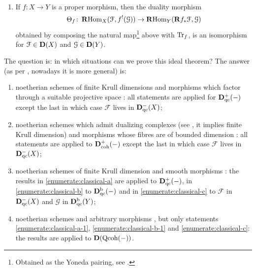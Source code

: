 \documentclass[10pt,a4paper]{article}
\begin{document}
\begin{theorem} {\ }
\begin{enumerate}
\begin{enumerate}
        \item\label{enumerate:classical-b-2} if $X=\mathbb{P}_Y^n$, then $\Tr_f$ is the map deduced from the canonical isomorphism $\mathbf{R}^nf_*(\omega)\cong\mathcal{O}_Y$;
        \item\label{enumerate:classical-b-3} if $f$ is a finite morphism, then $\Tr_f$ is obtained from the natural map ``evaluation at one''
          \begin{equation}
            \HHom_{\mathcal{O}_Y}(f_*\mathcal{O}_X,\mathcal{G})\to\mathcal{G}.
          \end{equation}
      \end{enumerate}
    \item\label{enumerate:classical-c} If $f\colon X\to Y$ is a proper morphism, then the duality morphism
      \begin{equation}
        \Theta_f\colon\operatorname{\mathbf{R}Hom}_X(\mathcal{F},f^!(\mathcal{G}))\to\operatorname{\mathbf{R}Hom}_Y(\mathbf{R}f_*\mathcal{F},\mathcal{G})
      \end{equation}
      obtained by composing the natural map\footnote{Obtained as the Yoneda pairing, see \cite[page 5]{hartshorne-residues-and-duality}.} above with $\Tr_f$, is an isomorphism for $\mathcal{F}\in\mathbf{D}(X)$ and $\mathcal{G}\in\mathbf{D}(Y)$.
  \end{enumerate}
\end{theorem}
The question is: in which situations can we prove this ideal theorem? The answer (as per \cite{hartshorne-residues-and-duality}, nowadays it is more general) is:
\begin{enumerate}
  \item noetherian schemes of finite Krull dimensions and morphisms which factor through a suitable projective space \cite[\S III.8, \S III.10, \S III.11]{hartshorne-residues-and-duality}: all statements are applied for $\mathbf{D}_{\mathrm{qc}}^+(-)$ except the last in which case $\mathcal{F}$ lives in $\mathbf{D}_{\mathrm{qc}}^-(X)$;
  \item noetherian schemes which admit dualizing complexes (see \cite[\S V.10]{hartshorne-residues-and-duality}, it implies finite Krull dimension) and morphisms whose fibres are of bounded dimension \cite[\S VII.3]{hartshorne-residues-and-duality}: all statements are applied to $\mathbf{D}_{\mathrm{coh}}^+(-)$ except the last in which case $\mathcal{F}$ lives in $\mathbf{D}_{\mathrm{qc}}^-(X)$;
  \item noetherian schemes of finite Krull dimension and smooth morphisms \cite[\S VII.4]{hartshorne-residues-and-duality}: the results in \ref{enumerate:classical-a} are applied to $\mathbf{D}_{\mathrm{qc}}^+(-)$, in \ref{enumerate:classical-b} to $\mathbf{D}_{\mathrm{qc}}^{\mathrm{b}}(-)$ and in \ref{enumerate:classical-c} to $\mathcal{F}$ in $\mathbf{D}_{\mathrm{qc}}^-(X)$ and $\mathcal{G}$ in $\mathbf{D}_{\mathrm{qc}}^{\mathrm{b}}(Y)$;
  \item noetherian schemes and arbitrary morphisms \cite[appendix]{hartshorne-residues-and-duality}, but only statements \ref{enumerate:classical-a-1}, \ref{enumerate:classical-b-1} and \ref{enumerate:classical-c}: the results are applied to $\mathbf{D}(\mathrm{Qcoh}(-))$.
\end{enumerate}
\end{document}
